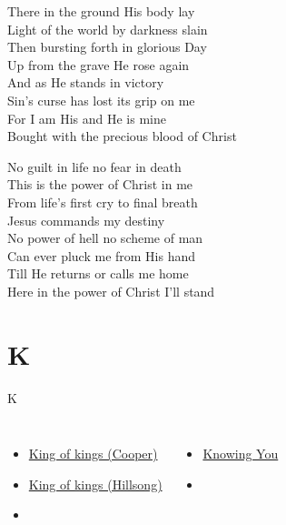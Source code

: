 \documentclass[aspectratio=169]{beamer}
\begin{document}
{\begin{frame}{}
\end{frame}
\hypertarget{In Christ alone[]3}{}
\begin{frame}{}
\fontsize{18.75}{22.5}\selectfont

There in the ground His body lay\\ 
Light of the world by darkness slain\\ 
Then bursting forth in glorious Day\\ 
Up from the grave He rose again\\ 
And as He stands in victory\\ 
Sin's curse has lost its grip on me\\ 
For I am His and He is mine\\ 
Bought with the precious blood of Christ

\end{frame}
\hypertarget{In Christ alone[]4}{}
\begin{frame}{}
\fontsize{18.75}{22.5}\selectfont

No guilt in life no fear in death\\ 
This is the power of Christ in me\\ 
From life's first cry to final breath\\ 
Jesus commands my destiny\\ 
No power of hell no scheme of man\\ 
Can ever pluck me from His hand\\ 
Till He returns or calls me home\\ 
Here in the power of Christ I'll stand

\end{frame}
}

\section{ K }

\begin{frame}[t]{K}
\begin{columns}[t]
\begin{itemize}
    \item \hyperlink{King of kings[](Cooper)}{King of kings (Cooper)}
    \item \hyperlink{King of kings[](Hillsong)}{King of kings (Hillsong)}
    \item[] \phantom{1}
\end{itemize}
\begin{itemize}
    \item \hyperlink{Knowing You['All I once held dear']}{Knowing You}
    \item[] \phantom{1}
\end{itemize}
\end{columns}
\end{frame}
\end{document}
